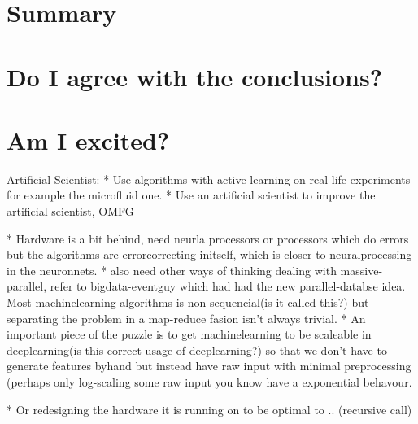 \documentclass{article}
\begin{document}

\section{Summary} %

\section{Do I agree with the conclusions?}

\section{Am I excited?}

Artificial Scientist: 
* Use algorithms with active learning on real life experiments for example the
microfluid one.
* Use an artificial scientist to improve the artificial scientist, OMFG

* Hardware is a bit  behind, need neurla processors or processors which do
errors but the algorithms are errorcorrecting initself, which is closer to
neuralprocessing in the neuronnets.
* also need other ways of thinking dealing with massive-parallel, refer to
bigdata-eventguy which had had the new parallel-databse idea. Most
machinelearning algorithms is non-sequencial(is it called this?) but separating
the problem in a map-reduce fasion isn't always trivial.
* An important piece of the puzzle is to get machinelearning to be scaleable in
deeplearning(is this correct usage of deeplearning?) so that we don't have to
generate features byhand but instead have raw input with minimal preprocessing
(perhaps only log-scaling some raw input you know have a exponential behavour.

* Or redesigning the hardware it is running on to be optimal to .. (recursive
call)
\end{document}
